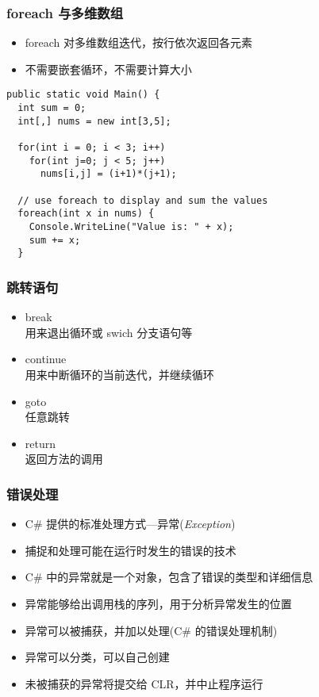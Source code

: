 
\begin{frame}[fragile]
\frametitle{foreach 与多维数组}
\begin{itemize}
\item foreach 对多维数组迭代，按行依次返回各元素
\item 不需要嵌套循环，不需要计算大小
\end{itemize}
\begin{lstlisting}
public static void Main() {
  int sum = 0;
  int[,] nums = new int[3,5];

  for(int i = 0; i < 3; i++)
    for(int j=0; j < 5; j++)
      nums[i,j] = (i+1)*(j+1);

  // use foreach to display and sum the values
  foreach(int x in nums) {
    Console.WriteLine("Value is: " + x);
    sum += x;
  }
\end{lstlisting}
\end{frame}


\begin{frame}
\frametitle{跳转语句}
\begin{itemize}
\item break \\用来退出循环或 swich 分支语句等
\item continue \\用来中断循环的当前迭代，并继续循环
\item goto \\任意跳转
\item return \\返回方法的调用
\end{itemize}
\end{frame}

\begin{frame}
\frametitle{错误处理}
\begin{itemize}
    \setlength{\itemsep}{8pt plus 1pt}
\item C\# 提供的标准处理方式---异常(\textit{Exception})
\item 捕捉和处理可能在运行时发生的错误的技术
\item C\# 中的异常就是一个对象，包含了错误的类型和详细信息
\item 异常能够给出调用栈的序列，用于分析异常发生的位置
\item 异常可以被捕获，并加以处理(C\# 的错误处理机制)
\item 异常可以分类，可以自己创建
\item 未被捕获的异常将提交给 CLR，并中止程序运行
\end{itemize}

\end{frame}

